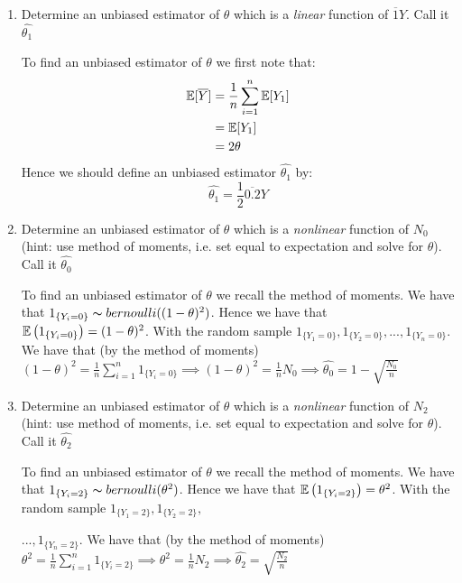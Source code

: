 \documentclass[12pt, a4paper]{article}\usepackage[]{graphicx}\usepackage[]{color}
\begin{document}
\begin{enumerate}[label={\bfseries\arabic*.}]
\item Determine an unbiased estimator of $\theta$ which is a \textit{linear} function of $\overbar{1}{Y}$. Call it $\hat{\theta_1}$

{\setlength{\leftskip}{3ex}

To find an unbiased estimator of $\theta$ we first note that:
\begin{align*}
\E[\overbar{0.5}{Y}] & = \frac{1}{n}\sum_{i = 1}^n\E[Y_1]\\
& = \E[Y_1] \\
& = 2\theta
\end{align*}
Hence we should define an unbiased estimator $\hat{\theta_1}$ by: 
$$\hat{\theta_1} = \frac{1}{2}\overbar{0.2}{Y}$$
}
\item Determine an unbiased estimator of $\theta$ which is a \textit{nonlinear} function of $N_0$ (hint: use method of moments, i.e. set equal to expectation and solve for $\theta$). Call it $\hat{\theta_0}$

{\setlength{\leftskip}{3ex}

To find an unbiased estimator of $\theta$ we recall the method of moments. We have that $1_{\{Y_i = 0\}} \thicksim bernoulli((1 - \theta)^2)$. Hence we have that $\operatorname{\mathbb{E}}\left(1_{\{Y_i = 0\}}\right) = (1 - \theta)^2$. With the random sample $1_{\{Y_1 = 0\}}, 1_{\{Y_2 = 0\}}, ..., 1_{\{Y_n = 0\}}$. We have that (by the method of moments) $ (1 - \theta)^2 = \frac{1}{n}\sum_{i = 1}^n 1_{\{Y_i = 0\}} \implies (1 - \theta)^2 = \frac{1}{n}N_0 \implies \hat{\theta_0} = 1 - \sqrt{\frac{N_0}{n}}$

}

\item Determine an unbiased estimator of $\theta$ which is a \textit{nonlinear} function of $N_2$ (hint: use method of moments, i.e. set equal to expectation and solve for $\theta$). Call it $\hat{\theta_2}$

{\setlength{\leftskip}{3ex}

To find an unbiased estimator of $\theta$ we recall the method of moments. We have that $1_{\{Y_i = 2\}} \thicksim bernoulli(\theta^2)$. Hence we have that $\operatorname{\mathbb{E}}\left(1_{\{Y_i = 2\}}\right) =\theta^2$. With the random sample $1_{\{Y_1 = 2\}}, 1_{\{Y_2 = 2\}},$ 

$..., 1_{\{Y_n = 2\}}$. We have that (by the method of moments) $ \theta^2 = \frac{1}{n}\sum_{i = 1}^n 1_{\{Y_i = 2\}} \implies \theta^2 = \frac{1}{n}N_2 \implies \hat{\theta_2} = \sqrt{\frac{N_2}{n}}$

}
\end{enumerate}
\end{document}
